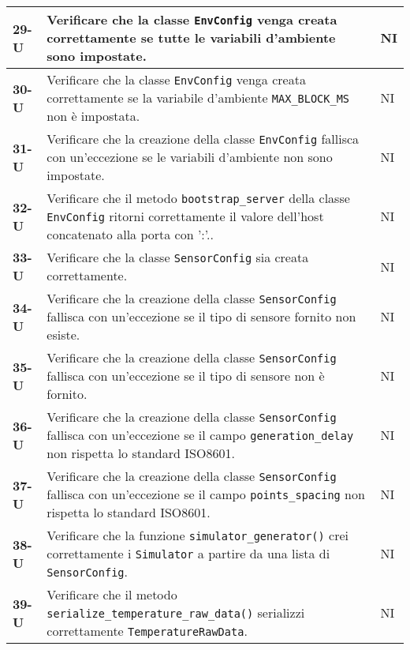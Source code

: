 \begin{longtable}{|>{\raggedright\arraybackslash}m{}|>{\raggedright\arraybackslash}m{}|>{\raggedright\arraybackslash}m{}|}
	\hline
	\textbf{29-U}   & Verificare che la classe \texttt{EnvConfig} venga creata correttamente se tutte le variabili d'ambiente sono impostate.                                           & NI             \\
	\hline
	\textbf{30-U}   & Verificare che la classe \texttt{EnvConfig} venga creata correttamente se la variabile d'ambiente \texttt{MAX\_BLOCK\_MS} non è impostata.                        & NI             \\
	\hline
	\textbf{31-U}   & Verificare che la creazione della classe \texttt{EnvConfig} fallisca con un'eccezione se le variabili d'ambiente non sono impostate.                              & NI             \\
	\hline
	\textbf{32-U}   & Verificare che il metodo \texttt{bootstrap\_server} della classe \texttt{EnvConfig} ritorni correttamente il valore dell'host concatenato alla porta con ':'..    & NI             \\
	\hline
	\textbf{33-U}   & Verificare che la classe \texttt{SensorConfig} sia creata correttamente.                                                                                          & NI             \\
	\hline
	\textbf{34-U}   & Verificare che la creazione della classe \texttt{SensorConfig} fallisca con un'eccezione se il tipo di sensore fornito non esiste.                                & NI             \\
	\hline
	\textbf{35-U}   & Verificare che la creazione della classe \texttt{SensorConfig} fallisca con un'eccezione se il tipo di sensore non è fornito.                                     & NI             \\
	\hline
	\textbf{36-U}   & Verificare che la creazione della classe \texttt{SensorConfig} fallisca con un'eccezione se il campo \texttt{generation\_delay} non rispetta lo standard ISO8601. & NI             \\
	\hline
	\textbf{37-U}   & Verificare che la creazione della classe \texttt{SensorConfig} fallisca con un'eccezione se il campo \texttt{points\_spacing} non rispetta lo standard ISO8601.   & NI             \\
	\hline
	\textbf{38-U}   & Verificare che la funzione \texttt{simulator\_generator()} crei correttamente i \texttt{Simulator} a partire da una lista di \texttt{SensorConfig}.               & NI             \\
	\hline
	\textbf{39-U}   & Verificare che il metodo \texttt{serialize\_temperature\_raw\_data()} serializzi correttamente \texttt{TemperatureRawData}.                                       & NI             \\

\end{longtable}

